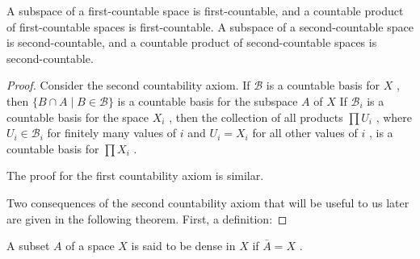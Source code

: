 \begin{theorem}
	A subspace of a first-countable space is first-countable, and a countable product of first-countable spaces is first-countable. A subspace of a second-countable space is second-countable, and a countable product of second-countable spaces is second-countable.

\end{theorem}
\begin{proof}
Consider the second countability axiom. If \(\mathcal{B}\) is a countable basis for \(X\) , then \(\{ B \cap  A \mid  B \in  \mathcal{B}\}\) is a countable basis for the subspace \(A\) of \(X\) If \({\mathcal{B}}_{i}\) is a countable basis for the space \({X}_{i}\) , then the collection of all products \(\prod {U}_{i}\) , where \({U}_{i} \in  {\mathcal{B}}_{i}\) for finitely many values of \(i\) and \({U}_{i} = {X}_{i}\) for all other values of \(i\) , is a countable basis for \(\prod {X}_{i}\) .

The proof for the first countability axiom is similar.

Two consequences of the second countability axiom that will be useful to us later are given in the following theorem. First, a definition:
\end{proof}

\begin{definition}
	A subset \(A\) of a space \(X\) is said to be dense in \(X\) if \(\bar{A} = X\) .
\end{definition}

